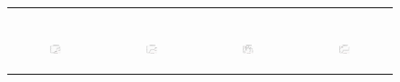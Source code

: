 \begin{figure}[ht]
\begin{tabular}{cccc}
\begin{subfigure}[b]{0.22\textwidth}
			\label{appfig:speedup_zigzag_setcover}
	  \end{subfigure} \\
	  \begin{subfigure}[b]{0.22\textwidth}
	  	\includegraphics[width=110pt]{images/diffFA_CF2G_bigsynthetic_maxgraphcut.pdf}
			\caption{}
			\label{appfig:diffFA_CF2G_bigsynthetic_maxgraphcut}
	  \end{subfigure} &
	  \begin{subfigure}[b]{0.22\textwidth}
	  	\includegraphics[width=110pt]{images/diffFA_CF2G_bigsynthetic_setcover.pdf}
			\caption{}
			\label{appfig:diffFA_CF2G_bigsynthetic_setcover}
	  \end{subfigure} &
	  \begin{subfigure}[b]{0.22\textwidth}
	  	\includegraphics[width=110pt]{images/diffFA_CF2G_zigzag_maxgraphcut.pdf}
			\caption{}
			\label{appfig:diffFA_CF2G_zigzag_maxgraphcut}
	  \end{subfigure} &
	  \begin{subfigure}[b]{0.22\textwidth}
	  	\includegraphics[width=110pt]{images/diffFA_CF2G_zigzag_setcover.pdf}

\end{subfigure}
\end{tabular}
\end{figure}
